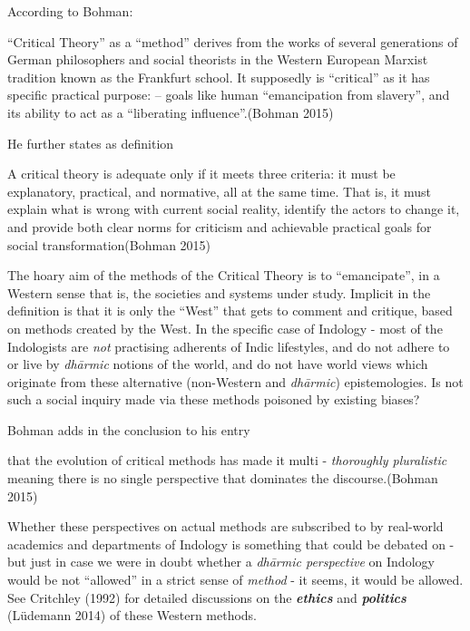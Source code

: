 According to Bohman:
\begin{myquote}
``Critical Theory'' as a ``method'' derives from the works of several generations of German philosophers and social theorists in the Western European Marxist tradition known as the Frankfurt school. It supposedly is ``critical'' as it has specific practical purpose: -- goals like human ``emancipation from slavery'', and its ability to act as a ``liberating influence''.\hfill (Bohman 2015)
\end{myquote}

He further states as definition
\begin{myquote}
A critical theory is adequate only if it meets three criteria: it must be explanatory, practical, and normative, all at the same time. That is, it must explain what is wrong with current social reality, identify the actors to change it, and provide both clear norms for criticism and achievable practical goals for social transformation\hfill (Bohman 2015)
\end{myquote}

\newpage

The hoary aim of the methods of the Critical Theory is to ``emancipate'', in a Western sense that is, the societies and systems under study. Implicit in the definition is that it is only the ``West'' that gets to comment and critique, based on methods created by the West. In the specific case of Indology - most of the Indologists are {\sl not} practising adherents of Indic lifestyles, and do not adhere to or live by {\sl dhārmic} notions of the world, and do not have world views which originate from these alternative (non-Western and {\sl dhārmic}) epistemologies. Is not such a social inquiry made via these methods poisoned by existing biases?

Bohman adds in the conclusion to his entry
\begin{myquote}
that the evolution of critical methods has made it multi - {\sl thoroughly pluralistic} meaning there is no single perspective that dominates the discourse.\hfill (Bohman 2015)
\end{myquote}

Whether these perspectives on actual methods are subscribed to by real-world  academics and departments of Indology is something that could be debated on - but just in case we were in doubt whether a {\sl dhārmic perspective} on Indology would be  not ``allowed'' in a strict sense of {\sl method} - it seems, it would be allowed. See Critchley (1992) for detailed discussions on the {{\sl\bfseries ethics}\relax} and {{\sl\bfseries politics}\relax} (Lüdemann 2014) of these Western methods.

